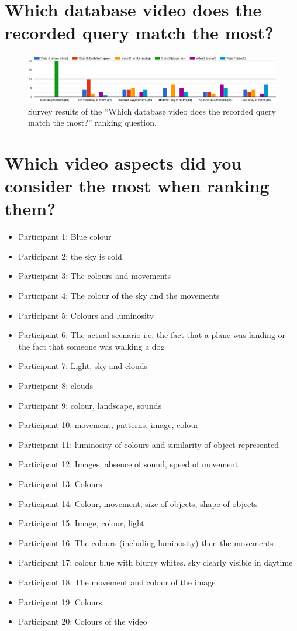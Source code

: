 \section{Which database video does the recorded query match the most?}

\begin{figure}[h] 
\centerline{\includegraphics[width=\textwidth]{figures/appendix/survey_results.png}}
\caption{\label{fig:appendix_survey_results}Survey results of the ``Which database video does the recorded query match the most?'' ranking question.}
\end{figure}

\section{Which video aspects did you consider the most when ranking them?}

\begin{itemize}
	\item Participant 1: Blue colour
    \item Participant 2: the sky is cold
    \item Participant 3: The colours and movements
    \item Participant 4: The colour of the sky and the movements
    \item Participant 5: Colours and luminosity
    \item Participant 6: The actual scenario i.e. the fact that a plane was landing or the fact that someone was walking a dog
    \item Participant 7: Light, sky and clouds
    \item Participant 8: clouds
    \item Participant 9: colour, landscape, sounds
    \item Participant 10: movement, patterns, image, colour
    \item Participant 11: luminosity of colours and similarity of object represented
    \item Participant 12: Images, absence of sound, speed of movement
    \item Participant 13: Colours
    \item Participant 14: Colour, movement, size of objects, shape of objects
    \item Participant 15: Image, colour, light
    \item Participant 16: The colours (including luminosity) then the movements
    \item Participant 17: colour blue with blurry whites. sky clearly visible in daytime
    \item Participant 18: The movement and colour of the image
    \item Participant 19: Colours
    \item Participant 20: Colours of the video
\end{itemize}

